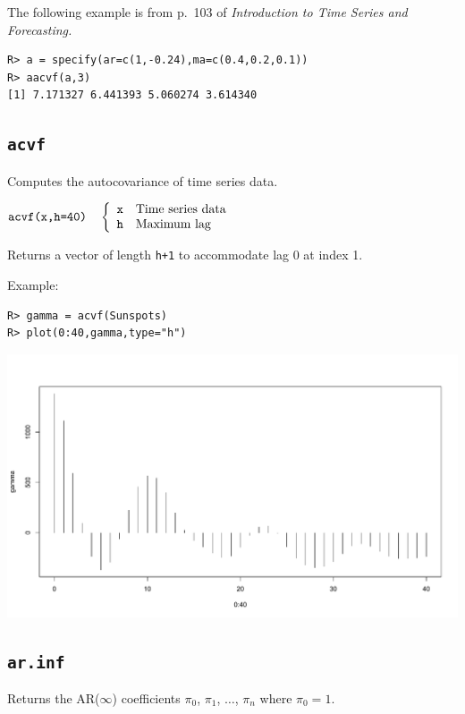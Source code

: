 \documentclass[12pt]{article}
\begin{document}
\bigskip
\noindent
The following example is from p.\ 103 of
{\it Introduction to Time Series and Forecasting.}

\begin{verbatim}
R> a = specify(ar=c(1,-0.24),ma=c(0.4,0.2,0.1))
R> aacvf(a,3)
[1] 7.171327 6.441393 5.060274 3.614340
\end{verbatim}

\newpage

\subsection{\tt acvf}
Computes the autocovariance of time series data.

\bigskip
$
\hbox{\tt acvf(x,h=40)}\quad\left\{\begin{array}{ll}
{\tt x} & \hbox{Time series data}\\
{\tt h} & \hbox{Maximum lag}
\end{array}\right.
$

\bigskip
\noindent
Returns a vector of length {\tt h+1} to accommodate lag 0
at index 1.

\bigskip
\noindent
Example:

\begin{verbatim}
R> gamma = acvf(Sunspots)
R> plot(0:40,gamma,type="h")
\end{verbatim}

\begin{center}
\includegraphics[scale=0.3]{Rplot-26.pdf}
\end{center}

\newpage

\subsection{\tt ar.inf}
Returns the AR($\infty$) coefficients
$\pi_0$, $\pi_1$, $\ldots$, $\pi_n$ where $\pi_0=1$.
\end{document}
